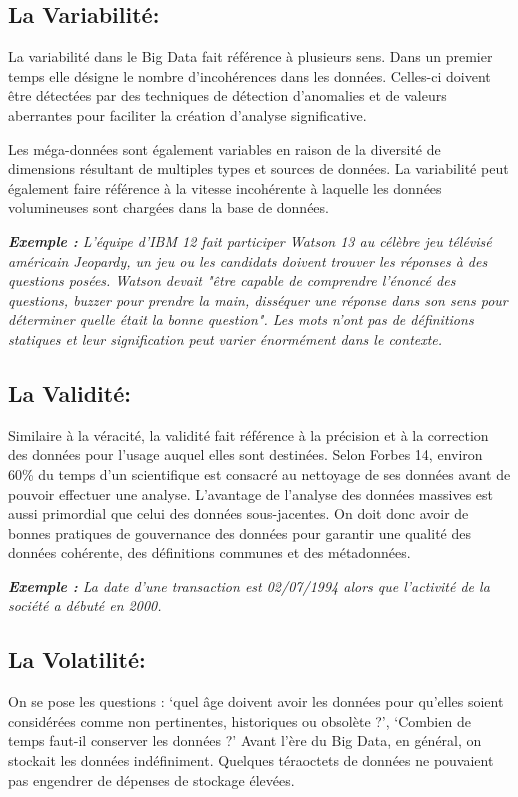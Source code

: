 \subsection{La Variabilité:}
La variabilité dans le Big Data fait référence à plusieurs sens. Dans un premier temps elle désigne le nombre d'incohérences dans les données. Celles-ci doivent être détectées par des techniques de détection d'anomalies et de valeurs aberrantes pour faciliter la création d'analyse significative. 

Les méga-données sont également variables en raison de la diversité de dimensions résultant de multiples types et sources de données. La variabilité peut également faire référence à la vitesse incohérente à laquelle les données volumineuses sont chargées dans la base de données.

\textit{\textbf{Exemple :} L'équipe d'IBM 12 fait participer Watson 13 au célèbre jeu télévisé américain Jeopardy, un jeu ou les candidats doivent trouver les réponses à des questions posées. Watson devait "être capable de comprendre l'énoncé des questions, buzzer pour prendre la main, disséquer une réponse dans son sens pour déterminer quelle était la bonne question". Les mots n'ont pas de définitions statiques et leur signification peut varier énormément dans le contexte.}

\subsection{La Validité:}
Similaire à la véracité, la validité fait référence à la précision et à la correction des données pour l'usage auquel elles sont destinées. Selon Forbes 14, environ 60\% du temps d'un scientifique est consacré au nettoyage de ses données avant de pouvoir effectuer une analyse. L'avantage de l'analyse des données massives est aussi primordial que celui des données sous-jacentes. On doit donc avoir de bonnes pratiques de gouvernance des données pour garantir une qualité des données cohérente, des définitions communes et des métadonnées.

\textit{\textbf{Exemple :} La date d'une transaction est  02/07/1994 alors que l'activité de la société a débuté en 2000.}

\subsection{La Volatilité:}
On se pose les questions : ‘quel âge doivent avoir les données pour qu'elles soient considérées comme non pertinentes, historiques ou obsolète ?’,  ‘Combien de temps faut-il conserver les données ?’ Avant l'ère du Big Data, en général, on stockait les données indéfiniment. Quelques téraoctets de données ne pouvaient pas engendrer de dépenses de stockage élevées. 

